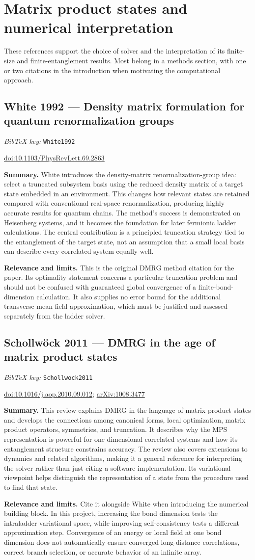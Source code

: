 \documentclass[11pt]{article}
\newcommand{\paper}[2]{\Needspace{8\baselineskip}\subsection{#2}\label{paper:#1}\textit{BibTeX key:} \texttt{#1}\quad\citep{#1}\par}
\newcommand{\doi}[1]{\href{https://doi.org/#1}{doi:#1}}
\newcommand{\arxiv}[1]{\href{https://arxiv.org/abs/#1}{arXiv:#1}}
\newcommand{\summary}{\par\textbf{Summary.} }
\newcommand{\relevance}{\par\textbf{Relevance and limits.} }
\begin{document}
\section{Matrix product states and numerical interpretation}
These references support the choice of solver and the interpretation of its finite-size and finite-entanglement results. Most belong in a methods section, with one or two citations in the introduction when motivating the computational approach.

\paper{White1992}{White 1992 --- Density matrix formulation for quantum renormalization groups}
\doi{10.1103/PhysRevLett.69.2863}
\summary White introduces the density-matrix renormalization-group idea: select a truncated subsystem basis using the reduced density matrix of a target state embedded in an environment. This changes how relevant states are retained compared with conventional real-space renormalization, producing highly accurate results for quantum chains. The method's success is demonstrated on Heisenberg systems, and it becomes the foundation for later fermionic ladder calculations. The central contribution is a principled truncation strategy tied to the entanglement of the target state, not an assumption that a small local basis can describe every correlated system equally well.
\relevance This is the original DMRG method citation for the paper. Its optimality statement concerns a particular truncation problem and should not be confused with guaranteed global convergence of a finite-bond-dimension calculation. It also supplies no error bound for the additional transverse mean-field approximation, which must be justified and assessed separately from the ladder solver.

\paper{Schollwock2011}{Schollw\"ock 2011 --- DMRG in the age of matrix product states}
\doi{10.1016/j.aop.2010.09.012}; \arxiv{1008.3477}
\summary This review explains DMRG in the language of matrix product states and develops the connections among canonical forms, local optimization, matrix product operators, symmetries, and truncation. It describes why the MPS representation is powerful for one-dimensional correlated systems and how its entanglement structure constrains accuracy. The review also covers extensions to dynamics and related algorithms, making it a general reference for interpreting the solver rather than just citing a software implementation. Its variational viewpoint helps distinguish the representation of a state from the procedure used to find that state.
\relevance Cite it alongside White when introducing the numerical building block. In this project, increasing the bond dimension tests the intraladder variational space, while improving self-consistency tests a different approximation step. Convergence of an energy or local field at one bond dimension does not automatically ensure converged long-distance correlations, correct branch selection, or accurate behavior of an infinite array.
\end{document}
